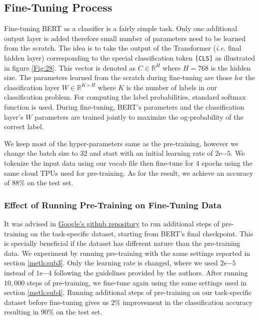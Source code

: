 \subsection{Fine-Tuning Process}
\label{meth:s5_sub6}


Fine-tuning \ac{BERT} as a classifier is a fairly simple task. Only one additional output layer is added therefore small number of parameters need to be learned from the scratch. The idea is to take the output of the Transformer (\textit{i.e.} final hidden layer) corresponding to the special classification token \texttt{[CLS]} as illustrated in figure \ref{Fig:28}. This vector is denoted as $C \in {\mathbb{R}}^{H}$ where $H=768$ is the hidden size. The parameters learned from the scratch during fine-tuning are those for the classification layer $W \in {\mathbb{R}}^{K\times H} $ where $K$ is the number of labels in our classification problem. For computing the label probabilities, standard softmax function is used. During fine-tuning, \ac{BERT}'s parameters and the classification layer's $W$ parameters are trained jointly to maximize the og-probability of the correct label.

We keep most of the hyper-parameters same as the pre-training, however we change the batch size to 32 and start with an initial learning rate of $2\mathrm{e}{-5}$. We tokenize the input data using our vocab file then fine-tune for 4 epochs using the same cloud \ac{TPU}s used for pre-training. As for the result, we achieve an accuracy of $88\%$ on the test set.


\subsubsection{Effect of Running Pre-Training on Fine-Tuning Data}
\label{meth:s5_sub6_subsub1}

It was advised in \href{https://github.com/google-research/bert#pre-training-tips-and-caveats}{Google's github repository} to run additional steps of pre-training on the task-specific dataset, starting from \ac{BERT}'s final checkpoint. This is specially beneficial if the dataset has different nature than the pre-training data. We experiment by running pre-training with the same settings reported in section \ref{meth:sub3}. Only the learning rate is changed, where we used $2\mathrm{e}{-5}$ instead of $1\mathrm{e}{-4}$ following the guidelines provided by the authors. After running $10,000$ steps of pre-training, we fine-tune again using the same settings used in section \ref{meth:sub4}. Running additional steps of pre-training on our task-specific dataset before fine-tuning gives us $2\%$ improvement in the classification accuracy resulting in $90\%$ on the test set.
